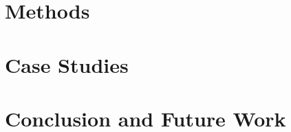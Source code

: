 \documentclass{article}
\begin{document}


\section{Methods}





\section{Case Studies}



\section{Conclusion and Future Work}








\medskip

\newpage

{


}


\newpage
\end{document}
